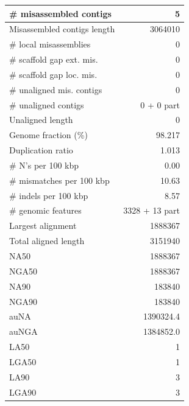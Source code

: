 \documentclass[12pt,a4paper]{article}
\begin{document}
\begin{table}[ht]
\begin{center}
\begin{tabular}{|l*{1}{|r}|}
\# misassembled contigs & 5 \\ \hline
Misassembled contigs length & 3064010 \\ \hline
\# local misassemblies & 0 \\ \hline
\# scaffold gap ext. mis. & 0 \\ \hline
\# scaffold gap loc. mis. & 0 \\ \hline
\# unaligned mis. contigs & 0 \\ \hline
\# unaligned contigs & 0 + 0 part \\ \hline
Unaligned length & 0 \\ \hline
Genome fraction (\%) & 98.217 \\ \hline
Duplication ratio & 1.013 \\ \hline
\# N's per 100 kbp & 0.00 \\ \hline
\# mismatches per 100 kbp & 10.63 \\ \hline
\# indels per 100 kbp & 8.57 \\ \hline
\# genomic features & 3328 + 13 part \\ \hline
Largest alignment & 1888367 \\ \hline
Total aligned length & 3151940 \\ \hline
NA50 & 1888367 \\ \hline
NGA50 & 1888367 \\ \hline
NA90 & 183840 \\ \hline
NGA90 & 183840 \\ \hline
auNA & 1390324.4 \\ \hline
auNGA & 1384852.0 \\ \hline
LA50 & 1 \\ \hline
LGA50 & 1 \\ \hline
LA90 & 3 \\ \hline
LGA90 & 3 \\ \hline
\end{tabular}
\end{center}
\end{table}
\end{document}
